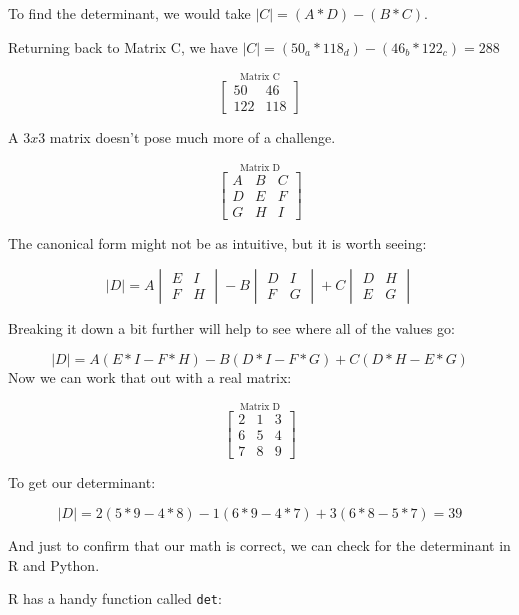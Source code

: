 \documentclass[
  letterpaper,
]{krantz}
\begin{document}
To find the determinant, we would take \(\mid C \mid = (A*D) - (B*C)\).

Returning back to Matrix C, we have
\(\mid C \mid = (50_a*118_d) - (46_b*122_c) = 288\)

\[
\stackrel{\mbox{Matrix C}}{
\begin{bmatrix}
50 & 46\\
122 & 118
\end{bmatrix}
}
\]

A \(3x3\) matrix doesn't pose much more of a challenge.

\[
\stackrel{\mbox{Matrix D}}{
\begin{bmatrix}
A & B & C\\
D & E & F\\
G & H & I
\end{bmatrix}
}
\]

The canonical form might not be as intuitive, but it is worth seeing:

\[
\mid D \mid = A\begin{vmatrix}
E & I\\
F & H
\end{vmatrix}  - 
B\begin{vmatrix}
D & I\\
F & G
\end{vmatrix} + 
C\begin{vmatrix}
D & H\\
E & G
\end{vmatrix}
\]

Breaking it down a bit further will help to see where all of the values
go:

\[
\mid D \mid = A(E*I - F*H) - B(D*I - F*G) + C(D*H - E*G)
\] Now we can work that out with a real matrix:

\[
\stackrel{\mbox{Matrix D}}{
\begin{bmatrix}
2 & 1 & 3\\
6 & 5 & 4\\
7 & 8 & 9
\end{bmatrix}
}
\]

To get our determinant:

\[
\mid D \mid = 2(5*9 - 4*8) - 1(6*9 - 4*7) + 3(6*8 - 5*7) = 39
\]

And just to confirm that our math is correct, we can check for the
determinant in R and Python.

R has a handy function called \texttt{det}:
\end{document}
